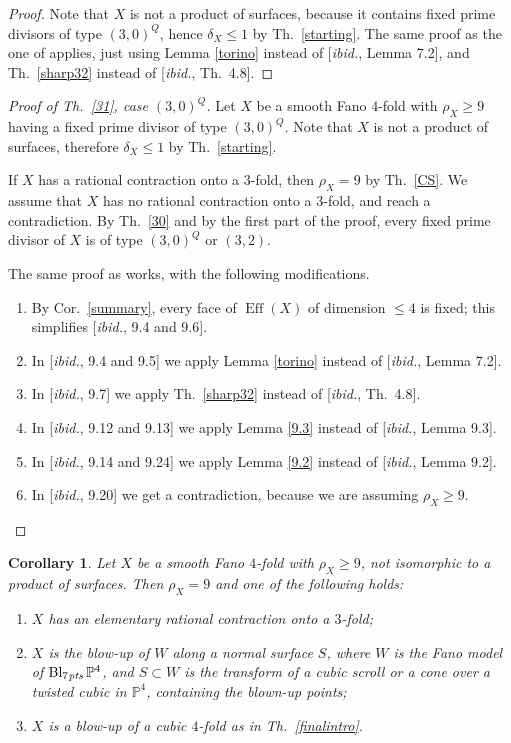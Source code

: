 \documentclass[a4paper,12pt]{amsart}
\newtheorem{corollary}[thm]{Corollary}
\theoremstyle{definition}
\numberwithin{figure}{section}
\numberwithin{table}{section}
\newcommand{\pr}{\mathbb{P}}
\newcommand{\Eff}{\operatorname{Eff}}
\newcommand{\Bl}{\operatorname{Bl}}
\newcommand{\pts}{\text{\it pts}}
\begin{document}
       \begin{proof}
         Note that $X$ is not a product of surfaces, because it contains fixed prime divisors of type $(3,0)^Q$, hence $\delta_X\leq 1$ by Th.~\ref{starting}.
The same proof as the one of \cite[Lemma 9.3]{small} applies, just using Lemma \ref{torino} instead of [\emph{ibid.}, Lemma 7.2], and Th.~\ref{sharp32} instead of [\emph{ibid.}, Th.~4.8].
         \end{proof}
          \begin{proof}[Proof of Th.~\ref{31}, case $(3,0)^Q$]
Let $X$ be a smooth Fano $4$-fold with $\rho_X\geq 9$ having a fixed prime divisor of type $(3,0)^Q$.
            Note that $X$ is not a product of surfaces,  therefore $\delta_X\leq 1$ by Th.~\ref{starting}.

         If  $X$ has a rational contraction onto a $3$-fold,  then $\rho_X=9$ by Th.~\ref{CS}.
         We assume that  $X$ has no rational contraction onto a $3$-fold, and reach a contradiction.
         By Th.~\ref{30} and by the first part of the proof, every fixed prime divisor of $X$ is of type $(3,0)^Q$ or $(3,2)$.
         
         The same proof as \cite[proof of Th.~9.1]{small} works, with the following modifications.
            \begin{enumerate}[$\bullet$]
            \item By Cor.~\ref{summary}, every face of $\Eff(X)$ of dimension $\leq 4$ is fixed; this simplifies [\emph{ibid.}, 9.4 and 9.6]. 
            \item In [\emph{ibid.}, 9.4 and 9.5] we apply Lemma \ref{torino} instead of  [\emph{ibid.}, Lemma 7.2].
     \item In [\emph{ibid.}, 9.7] we apply Th.~\ref{sharp32} instead of  [\emph{ibid.}, Th.~4.8].           
\item
            In [\emph{ibid.}, 9.12 and 9.13] we apply Lemma \ref{9.3} instead of [\emph{ibid.}, Lemma 9.3].
\item
  In [\emph{ibid.}, 9.14 and 9.24] we apply Lemma \ref{9.2} instead of [\emph{ibid.}, Lemma 9.2].
\item
  In [\emph{ibid.}, 9.20] we get a contradiction, because we are assuming $\rho_X\geq 9$.
  \qedhere
          \end{enumerate}
        \end{proof}
        \begin{corollary}\label{explicitfinal}
  Let $X$ be a smooth Fano $4$-fold with $\rho_X\geq 9$, not isomorphic to a product of surfaces.
Then $\rho_X=9$ and one of the following holds:
\begin{enumerate}[$(i)$]
\item $X$ has an elementary rational contraction onto a $3$-fold;
\item  $X$ is the blow-up of $W$ along a normal surface $S$,
  where $W$ is the Fano model of $\Bl_{7\mskip1mu\pts}\pr^4$, and $S\subset W$ is the transform of a cubic scroll or
  a cone over a twisted cubic in
$\pr^4$, containing the blown-up points;
\item  $X$ is a blow-up of a cubic $4$-fold as in Th.~\ref{finalintro}.
     \end{enumerate}
   \end{corollary}
\end{document}

